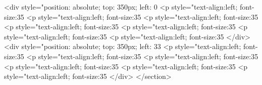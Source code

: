 					<div style="position: absolute; top: 350px; left: 0%
        				    <p style="text-align:left; font-size:35%
        				    <p style="text-align:left; font-size:35%
        				    <p style="text-align:left; font-size:35%
        				    <p style="text-align:left; font-size:35%
        				    <p style="text-align:left; font-size:35%
        				    <p style="text-align:left; font-size:35%
        				    <p style="text-align:left; font-size:35%
                                        </div>
					<div style="position: absolute; top: 350px; left: 33%
        				    <p style="text-align:left; font-size:35%
        				    <p style="text-align:left; font-size:35%
        				    <p style="text-align:left; font-size:35%
        				    <p style="text-align:left; font-size:35%
        				    <p style="text-align:left; font-size:35%
        				    <p style="text-align:left; font-size:35%
                                        </div>
                                </section>

